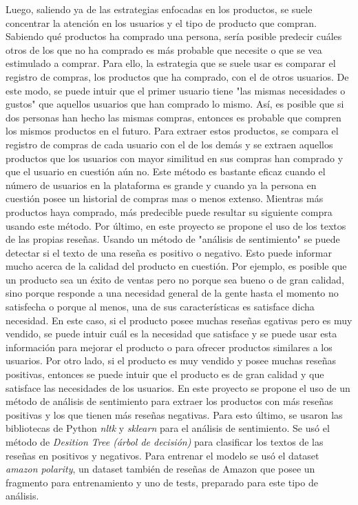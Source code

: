 \documentclass{llncs}
\begin{document}
    Luego, saliendo ya de las estrategias enfocadas en los productos, se suele concentrar la atenci\'on en los usuarios y el tipo de producto que compran. Sabiendo qu\'e productos ha comprado una persona, ser\'ia posible predecir cu\'ales otros de los que no ha comprado es m\'as probable que necesite o que se vea estimulado a comprar. Para ello, la estrategia que se suele usar es comparar el registro de compras, los productos que ha comprado, con el de otros usuarios. De este modo, se puede intuir que el primer usuario tiene "las mismas necesidades o gustos" que aquellos usuarios que han comprado lo mismo. As\'i, es posible que si dos personas han hecho las mismas compras, entonces es probable que compren los mismos productos en el futuro. Para extraer estos productos, se compara el registro de compras de cada usuario con el de los dem\'as y se extraen aquellos productos que los usuarios con mayor similitud en sus compras han comprado y que el usuario en cuesti\'on a\'un no. Este m\'etodo es bastante eficaz cuando el n\'umero de usuarios en la plataforma es grande y cuando ya la persona en cuesti\'on posee un historial de compras mas o menos extenso. Mientras m\'as productos haya comprado, m\'as predecible puede resultar su siguiente compra usando este m\'etodo.
    Por \'ultimo, en este proyecto se propone el uso de los textos de las propias rese\~nas. Usando un m\'etodo de "an\'alisis de sentimiento" se puede detectar si el texto de una rese\~na es positivo o negativo. Esto puede informar mucho acerca de la calidad del producto en cuesti\'on. Por ejemplo, es posible que un producto sea un \'exito de ventas pero no porque sea bueno o de gran calidad, sino porque responde a una necesidad general de la gente hasta el momento no satisfecha o porque al menos, una de sus caracter\'isticas es satisface dicha necesidad. En este caso, si el producto posee muchas rese\~nas egativas pero es muy vendido, se puede intuir cu\'al es la necesidad que satisface y se puede usar esta informaci\'on para mejorar el producto o para ofrecer productos similares a los usuarios. Por otro lado, si el producto es muy vendido y posee muchas rese\~nas positivas, entonces se puede intuir que el producto es de gran calidad y que satisface las necesidades de los usuarios. En este proyecto se propone el uso de un m\'etodo de an\'alisis de sentimiento para extraer los productos con m\'as rese\~nas positivas y los que tienen m\'as rese\~nas negativas.
    Para esto \'ultimo, se usaron las bibliotecas de Python \textit{nltk} y \textit{sklearn} para el an\'alisis de sentimiento. Se us\'o el m\'etodo de \textit{Desition Tree (\'arbol de decisi\'on)} para clasificar los textos de las rese\~nas en positivos y negativos. Para entrenar el modelo se us\'o el dataset \textit{amazon polarity}, un dataset tambi\'en de rese\~nas de Amazon que posee un fragmento para entrenamiento y uno de tests, preparado para este tipo de an\'alisis.
    
\end{document}
